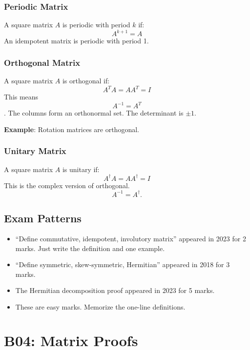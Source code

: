\documentclass[
]{article}
\providecommand{\tightlist}{%
  \setlength{\itemsep}{0pt}\setlength{\parskip}{0pt}}
\begin{document}
\subsubsection{Periodic Matrix}\label{periodic-matrix}

A square matrix \(A\) is periodic with period \(k\) if:
\[
A^{k+1} = A
\]
An idempotent matrix is periodic with period 1.

\subsubsection{Orthogonal Matrix}\label{orthogonal-matrix}

A square matrix \(A\) is orthogonal if:
\[
A^T A = AA^T = I
\]
This means
\[
A^{-1} = A^T
\]
. The columns form an orthonormal set. The determinant is \(\pm 1\).

\textbf{Example}: Rotation matrices are orthogonal.

\subsubsection{Unitary Matrix}\label{unitary-matrix}

A square matrix \(A\) is unitary if:
\[
A^\dagger A = AA^\dagger = I
\]
This is the complex version of orthogonal.
\[
A^{-1} = A^\dagger.
\]

\subsection{Exam Patterns}\label{exam-patterns-18}

\begin{itemize}
\tightlist
\item
  ``Define commutative, idempotent, involutory matrix'' appeared in 2023
  for 2 marks. Just write the definition and one example.
\item
  ``Define symmetric, skew-symmetric, Hermitian'' appeared in 2018 for 3
  marks.
\item
  The Hermitian decomposition proof appeared in 2023 for 5 marks.
\item
  These are easy marks. Memorize the one-line definitions.
\end{itemize}

\section{B04: Matrix Proofs}\label{b04-matrix-proofs}
\end{document}
